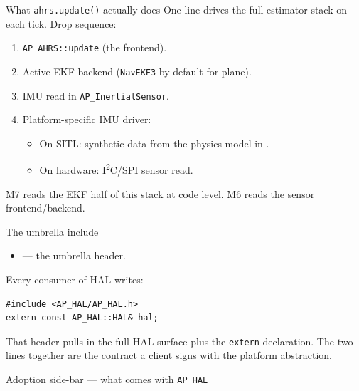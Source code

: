 \documentclass[aspectratio=169,11pt]{beamer}
\begin{document}
\begin{frame}{What \texttt{ahrs.update()} actually does}
  One line drives the full estimator stack on each tick.
  \vfill
  Drop sequence:
  \begin{enumerate}
    \item \texttt{AP\_AHRS::update} (the frontend).
    \item Active EKF backend (\texttt{NavEKF3} by default for plane).
    \item IMU read in \texttt{AP\_InertialSensor}.
    \item Platform-specific IMU driver:
    \begin{itemize}
      \item On SITL: synthetic data from the physics model in .
      \item On hardware: I\textsuperscript{2}C/SPI sensor read.
    \end{itemize}
  \end{enumerate}
  \vfill
  M7 reads the EKF half of this stack at code level. M6 reads the sensor frontend/backend.
\end{frame}

\begin{frame}[fragile]{The umbrella include}
  \begin{itemize}
    \item {} --- the umbrella header.
  \end{itemize}
  \vfill
  Every consumer of HAL writes:
  \begin{Verbatim}[fontsize=\small,frame=single]
#include <AP_HAL/AP_HAL.h>
extern const AP_HAL::HAL& hal;
  \end{Verbatim}
  \vfill
  That header pulls in the full HAL surface plus the \texttt{extern} declaration.
  \vfill
  The two lines together are the contract a client signs with the platform abstraction.
\end{frame}

\begin{frame}{Adoption side-bar --- what comes with \texttt{AP\_HAL}}
\end{frame}
\end{document}
